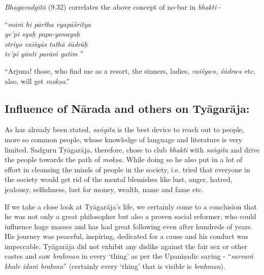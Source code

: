 \vspace{-.3cm}

\textit{Bhagavadgītā} (9.32) correlates the above concept of no-bar in \textit{bhakti} -

\begin{centerquote}
“\textit{māṁ hi pārtha vyapāśritya}\\ \textit{ye’pi syuḥ papa-yonayaḥ }\\ \textit{striyo vaiśyās tathā śūdrāḥ} \\ \textit{te’pi yānti parāṁ gatim }”
\end{centerquote}

``Arjuna! those, who find me as a resort, the sinners, ladies, \textit{vaiśya}-s, \textit{śūdra}-s etc. also, will get \textit{mokṣa}.''


\vspace{-.4cm}

\subsection*{Influence of Nārada and others on Tyāgarāja:}

\vspace{-.2cm}

As has already been stated, \textit{saṅgīta} is the best device to reach out to people, more so common people, whose knowledge of language and literature is very limited. Sadguru Tyāgarāja, therefore, chose to club \textit{bhakti} with \textit{saṅgīta} and drive the people towards the path of \textit{mokṣa}. While doing so he also put in a lot of effort in cleansing the minds of people in the society, i.e. tried that everyone in the society would get rid of the mental blemishes like lust, anger, hatred, jealousy, selfishness, lust for money, wealth, name and fame etc. 

If we take a close look at Tyāgarāja’s life, we certainly come to a conclusion that he was not only a great philosopher but also a proven social reformer, who could influence huge masses and has had great following even after hundreds of years. His journey was peaceful, inspiring, dedicated for a cause and his conduct was impeccable. Tyāgarāja did not exhibit any dislike against the fair sex or other castes and saw \textit{brahman} in every ‘thing’ as per the Upaniṣadic saying - “\textit{sarvaṁ khalv idaṁ brahma}” (certainly every ‘thing’ that is visible is \textit{brahman}).

